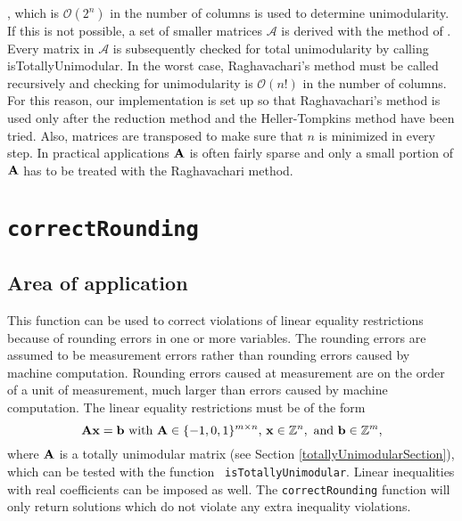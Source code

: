 \documentclass[11pt, fleqn, a4paper]{article}
\begin{document}
\cite{heller:1956}, which is $\mathcal{O}(2^n)$ in the number of columns is
used to determine unimodularity.  If this is not possible, a set of smaller
matrices $\mathcal{A}$ is derived with the method of \cite{raghavachari:1976}.
Every matrix in $\mathcal{A}$ is subsequently checked for total unimodularity
by calling {\sc isTotallyUnimodular}. In the worst case, Raghavachari's method
must be called recursively and checking for unimodularity is $\mathcal{O}(n!)$
in the number of columns. For this reason, our implementation is set up so that
Raghavachari's method is used only after the reduction method and the
Heller-Tompkins method have been tried. Also, matrices are transposed to make
sure that $n$ is minimized in every step. In practical applications $\bf A$ is
often fairly sparse and only a small portion of $\bf A$ has to be treated with the
Raghavachari method.



\section{\tt correctRounding}
\label{roundingErrors}
\subsection{Area of application}
This function can be used to correct violations of linear equality restrictions
because of rounding errors in one or more variables.  The rounding errors are
assumed to be measurement errors rather than rounding errors caused by machine
computation. Rounding errors caused at measurement are on the order of a unit
of measurement, much larger than errors caused by machine computation. The
linear equality restrictions must be of the form
\begin{displaymath}
{\bf A}{\bf x} = {\bf b} \textrm{ with } {\bf A}\in \{-1,0,1\}^{m\times n}\textrm{, } {\bf x}\in \mathbb{Z}^{n},\textrm{ and } {\bf b}\in\mathbb{Z}^m,
\end{displaymath}
where $\bf A$ is a totally unimodular matrix (see Section
\ref{totallyUnimodularSection}), which can be tested with the function {\tt
isTotallyUnimodular}. Linear inequalities with real coefficients can be imposed
as well. The {\tt correctRounding} function will only return solutions which do
not violate any extra inequality violations.
\end{document}
